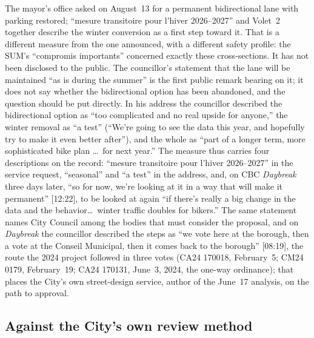 \documentclass[11pt,letterpaper]{article}
\begin{document}
The mayor's office asked on August~13 for a permanent bidirectional lane
with parking restored; ``mesure transitoire pour l'hiver 2026--2027'' and
Volet~2 together describe the winter conversion as a first step toward it. That is
a different measure from the one announced, with a different safety
profile: the SUM's ``compromis importants'' concerned exactly these
cross-sections. It has not been disclosed to the public. The councillor's
statement that the lane will be maintained ``as is during the summer'' is
the first public remark bearing on it; it does not say whether the
bidirectional option has been abandoned, and the question should be put
directly. In his address the councillor described the bidirectional option
as ``too complicated and no real upside for anyone,'' the winter removal
as ``a test'' (``We're going to see the data this year, and hopefully try
to make it even better after''), and the whole as ``part of a longer term,
more sophisticated bike plan \ldots\ for next year.'' The measure thus
carries four descriptions on the record: ``mesure transitoire pour
l'hiver 2026--2027'' in the service request, ``seasonal'' and ``a test''
in the address, and, on CBC \emph{Daybreak} three days later, ``so for
now, we're looking at it in a way that will make it permanent'' [12:22],
to be looked at again ``if there's really a big change in the data and the
behavior\ldots\ winter traffic doubles for bikers.'' The same statement
names City Council among the bodies that must consider the proposal, and
on \emph{Daybreak} the councillor described the steps as ``we vote here at
the borough, then a vote at the Conseil Municipal, then it comes back to
the borough'' [08:19], the route the 2024 project followed in three votes
(CA24 170018, February~5; CM24 0179, February~19; CA24 170131, June~3,
2024, the one-way ordinance); that places the City's own street-design
service, author of the June~17 analysis, on the path to approval.

\subsection{Against the City's own review method}
\end{document}
